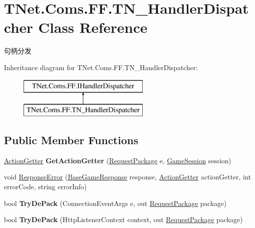 \hypertarget{class_t_net_1_1_coms_1_1_f_f_1_1_t_n___handler_dispatcher}{}\section{T\+Net.\+Coms.\+F\+F.\+T\+N\+\_\+\+Handler\+Dispatcher Class Reference}
\label{class_t_net_1_1_coms_1_1_f_f_1_1_t_n___handler_dispatcher}


句柄分发  


Inheritance diagram for T\+Net.\+Coms.\+F\+F.\+T\+N\+\_\+\+Handler\+Dispatcher\+:\begin{figure}[H]
\begin{center}
\leavevmode
\includegraphics[height=2.000000cm]{class_t_net_1_1_coms_1_1_f_f_1_1_t_n___handler_dispatcher}
\end{center}
\end{figure}
\subsection*{Public Member Functions}
\begin{DoxyCompactItemize}
\item 
\mbox{\label{class_t_net_1_1_coms_1_1_f_f_1_1_t_n___handler_dispatcher_a156c80ee10645d289757d324945040f2}} 
\mbox{\hyperlink{class_t_net_1_1_service_1_1_action_getter}{Action\+Getter}} {\bfseries Get\+Action\+Getter} (\mbox{\hyperlink{class_t_net_1_1_contract_1_1_request_package}{Request\+Package}} e, \mbox{\hyperlink{class_t_net_1_1_contract_1_1_game_session}{Game\+Session}} session)
\item 
void \mbox{\hyperlink{class_t_net_1_1_coms_1_1_f_f_1_1_t_n___handler_dispatcher_a6f4ae769f23e643131d2040b9e0674f8}{Response\+Error}} (\mbox{\hyperlink{class_t_net_1_1_service_1_1_base_game_response}{Base\+Game\+Response}} response, \mbox{\hyperlink{class_t_net_1_1_service_1_1_action_getter}{Action\+Getter}} action\+Getter, int error\+Code, string error\+Info)
\item 
\mbox{\label{class_t_net_1_1_coms_1_1_f_f_1_1_t_n___handler_dispatcher_a2f6e398fba6f5bad6313208f8a8a43d2}} 
bool {\bfseries Try\+De\+Pack} (Connection\+Event\+Args e, out \mbox{\hyperlink{class_t_net_1_1_contract_1_1_request_package}{Request\+Package}} package)
\item 
\mbox{\label{class_t_net_1_1_coms_1_1_f_f_1_1_t_n___handler_dispatcher_a4af2153784a6508cefccd1daf02d4508}} 
bool {\bfseries Try\+De\+Pack} (Http\+Listener\+Context context, out \mbox{\hyperlink{class_t_net_1_1_contract_1_1_request_package}{Request\+Package}} package)
\end{DoxyCompactItemize}
